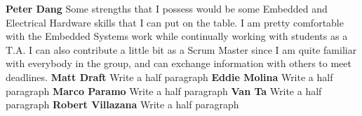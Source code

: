 \textbf{Peter Dang}\newline
Some strengths that I possess would be some Embedded and Electrical Hardware skills that I can put on the table. I am pretty comfortable with the Embedded Systems work while continually working with students as a T.A. I can also contribute a little bit as a Scrum Master since I am quite familiar with everybody in the group, and can exchange information with others to meet deadlines.
\newline
\newline
\textbf{Matt Draft}\newline
Write a half paragraph
\newline
\newline
\textbf{Eddie Molina}\newline
Write a half paragraph
\newline
\newline
\textbf{Marco Paramo}\newline
Write a half paragraph
\newline
\newline
\textbf{Van Ta}\newline
Write a half paragraph
\newline
\newline
\textbf{Robert Villazana}\newline
Write a half paragraph
\newline
\newline